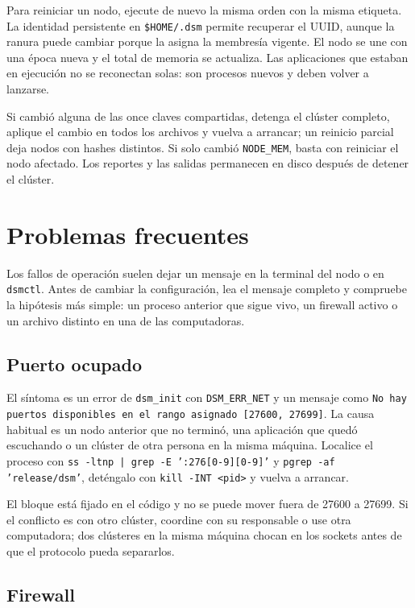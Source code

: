 Para reiniciar un nodo, ejecute de nuevo la misma orden con la misma etiqueta. La identidad persistente en \texttt{\$HOME/.dsm} permite recuperar el UUID, aunque la ranura puede cambiar porque la asigna la membresía vigente. El nodo se une con una época nueva y el total de memoria se actualiza. Las aplicaciones que estaban en ejecución no se reconectan solas: son procesos nuevos y deben volver a lanzarse.

Si cambió alguna de las once claves compartidas, detenga el clúster completo, aplique el cambio en todos los archivos y vuelva a arrancar; un reinicio parcial deja nodos con hashes distintos. Si solo cambió \texttt{NODE\_MEM}, basta con reiniciar el nodo afectado. Los reportes y las salidas permanecen en disco después de detener el clúster.

\section{Problemas frecuentes}\label{sec:problemas}

Los fallos de operación suelen dejar un mensaje en la terminal del nodo o en \texttt{dsmctl}. Antes de cambiar la configuración, lea el mensaje completo y compruebe la hipótesis más simple: un proceso anterior que sigue vivo, un firewall activo o un archivo distinto en una de las computadoras.

\subsection{Puerto ocupado}\label{subsec:puerto-ocupado}

El síntoma es un error de \texttt{dsm\_init} con \texttt{DSM\_ERR\_NET} y un mensaje como \texttt{No hay puertos disponibles en el rango asignado [27600, 27699]}. La causa habitual es un nodo anterior que no terminó, una aplicación que quedó escuchando o un clúster de otra persona en la misma máquina. Localice el proceso con \texttt{ss -ltnp | grep -E ':276[0-9][0-9]'} y \texttt{pgrep -af 'release/dsm'}, deténgalo con \texttt{kill -INT <pid>} y vuelva a arrancar.

El bloque está fijado en el código y no se puede mover fuera de 27600 a 27699. Si el conflicto es con otro clúster, coordine con su responsable o use otra computadora; dos clústeres en la misma máquina chocan en los sockets antes de que el protocolo pueda separarlos.

\subsection{Firewall}\label{subsec:firewall}

